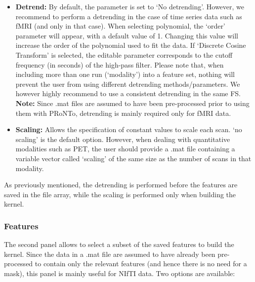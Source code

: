 \begin{itemize}

\item \textbf{Detrend:} By default, the parameter is set to `No detrending'. However, we recommend to perform a detrending in the case of time series data such as fMRI (and only in that case). When selecting polynomial, the `order' parameter will appear, with a default value of 1. Changing this value will increase the order of the polynomial used to fit the data. If `Discrete Cosine Transform' is selected, the editable parameter corresponds to the cutoff frequency (in seconds) of the high-pass filter. Please note that, when including more than one run (`modality') into a feature set, nothing will prevent the user from using different detrending methods/parameters. We however highly recommend to use a consistent detrending in the same FS. \textbf{Note:} Since .mat files are assumed to have been pre-processed prior to using them with PRoNTo, detrending is mainly required only for fMRI data.

\item \textbf{Scaling:} Allows the specification of constant values to scale each scan. `no scaling' is the default option. However, when dealing with quantitative modalities such as PET, the user should provide a .mat file containing a variable vector called `scaling' of the same size as the number of scans in that modality.


\end{itemize}

As previously mentioned, the detrending is performed before the features are saved in the file array, while the scaling is performed only when building the kernel.


\subsubsection{Features}

The second panel allows to select a subset of the saved features to build the kernel. Since the data in a .mat file are assumed to have already been pre-processed to contain only the relevant features (and hence there is no need for a mask), this panel is mainly useful for NIfTI data. Two options are available:

